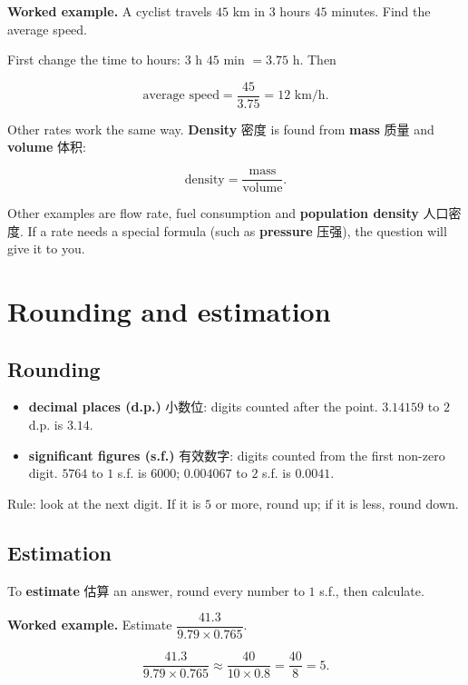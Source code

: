 \documentclass[11pt]{article}
\begin{document}
\textbf{Worked example.} A cyclist travels $45\text{ km}$ in $3$ hours $45$ minutes. Find the average speed.

First change the time to hours: $3$ h $45$ min $= 3.75$ h. Then

\[
\text{average speed} = \frac{45}{3.75} = 12\text{ km/h}.
\]

Other rates work the same way. \textbf{Density} 密度 is found from \textbf{mass} 质量 and \textbf{volume} 体积:

\[
\text{density} = \frac{\text{mass}}{\text{volume}}.
\]

Other examples are flow rate, fuel consumption and \textbf{population density} 人口密度. If a rate needs a special formula (such as \textbf{pressure} 压强), the question will give it to you.

\section*{Rounding and estimation}

\subsection*{Rounding}

\begin{itemize}
\item \textbf{decimal places (d.p.)} 小数位: digits counted after the point. $3.14159$ to $2$ d.p. is $3.14$.

\item \textbf{significant figures (s.f.)} 有效数字: digits counted from the first non-zero digit. $5764$ to $1$ s.f. is $6000$; $0.004067$ to $2$ s.f. is $0.0041$.

\end{itemize}

Rule: look at the next digit. If it is $5$ or more, round up; if it is less, round down.

\subsection*{Estimation}

To \textbf{estimate} 估算 an answer, round every number to $1$ s.f., then calculate.

\textbf{Worked example.} Estimate $\dfrac{41.3}{9.79 \times 0.765}$.

\[
\frac{41.3}{9.79 \times 0.765} \approx \frac{40}{10 \times 0.8} = \frac{40}{8} = 5.
\]
\end{document}
